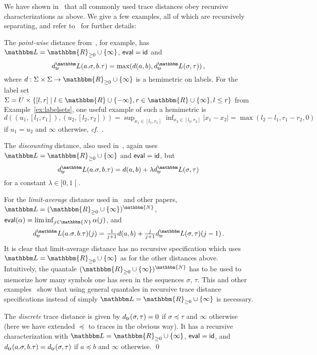\documentclass[twocolumn]{svjour3-dummy}
\newcommand*\labpre{\preccurlyeq}
\newcommand*\cf{\textit{cf.}\xspace}
\newcommand*\Real{\mathbbm{R}}
\newcommand*\LL{\mathbbm L}
\newcommand*\Realnn{\Real_{ \ge 0}}
\newcommand*\eval{\textup{\textsf{eval}}}
\newcommand*\td{d_\textup{\textsf{tr}}} \newcommand*\tdl{\td^\LL}
\newcommand*\id{\textup{\textsf{id}}}
\newcommand*\Nat{\mathbbm{N}}
\begin{document}
\begin{example}
  \label{ex:distances}
  We have shown in~\cite{DBLP:conf/fsttcs/FahrenbergLT11, DBLP:conf/csr/BauerFLT12,
    DBLP:conf/aplas/FahrenbergL13, DBLP:journals/tcs/FahrenbergL14,
    DBLP:journals/acta/FahrenbergL14} that all commonly used trace
  distances obey recursive characterizations as above.  We give a few
  examples, all of which are recursively separating, and refer
  to~\cite{DBLP:journals/tcs/FahrenbergL14,
    DBLP:journals/acta/FahrenbergL14} for further details:

  The \emph{point-wise} distance
  from~\cite{DBLP:journals/tcs/AlfaroFHMS05}, for example, has $\LL=
  \Realnn\cup\{ \infty\}$, $\eval= \id$ and
  \begin{equation*}
    \tdl( a. \sigma,
    b. \tau)= \max( d( a, b), \tdl( \sigma, \tau))\,,
  \end{equation*}
  where $d: \Sigma\times \Sigma\to \Realnn\cup\{ \infty\}$ is a
  hemimetric on labels.  For the label set $\Sigma= U\times\{[ l, r]\mid
  l\in \Real\cup\{ -\infty\}, r\in \Real\cup\{ \infty\}, l\le r\}$ from
  Example~\ref{ex:labelsets}, one useful example of such a hemimetric is
  $d(( u_1,[ l_1, r_1]),( u_2,[ l_2, r_2]))= \sup_{ x_1\in[ l_1, r_1]}
  \inf_{ x_2\in[ l_2, r_2]}| x_1- x_2|= \max( l_2- l_1, r_1- r_2, 0)$ if
  $u_1= u_2$ and $\infty$ otherwise,
  \cf~\cite{DBLP:journals/fmsd/BauerFJLLT13}.

  The \emph{discounting} distance, also used
  in~\cite{DBLP:journals/tcs/AlfaroFHMS05}, again uses $\LL=
  \Realnn\cup\{ \infty\}$ and $\eval= \id$, but
  \begin{equation*}
    \tdl( a. \sigma,
    b. \tau)= d( a, b)+ \lambda \tdl( \sigma, \tau)
  \end{equation*}
  for a constant $\lambda\in[ 0, 1\mathclose[$.

  For the \emph{limit-average} distance used
  in~\cite{DBLP:journals/tcs/CernyHR12} and other papers, $\LL=(
  \Realnn\cup\{ \infty\})^\Nat$, $\eval( \alpha)= \liminf_{ j\in \Nat}
  \alpha( j)$, and
  \begin{equation*}
    \tdl( a. \sigma, b. \tau)( j)= \tfrac 1{ j+ 1}d( a,
    b)+ \tfrac j{ j+ 1} \tdl( \sigma, \tau)( j- 1)\,.
  \end{equation*}
  It is clear that limit-average distance has no recursive
  specification which uses $\LL= \Realnn\cup\{ \infty\}$ as for the
  other distances above.  Intuitively, the quantale $( \Realnn\cup\{
  \infty\})^\Nat$ has to be used to memorize how many symbols one has
  seen in the sequences $\sigma$, $\tau$.  This and other
  examples~\cite{DBLP:journals/tcs/FahrenbergL14,
    DBLP:journals/acta/FahrenbergL14} show that using general
  quantales in recursive trace distance specifications instead of
  simply $\LL= \Realnn\cup\{ \infty\}$ is necessary.

  The \emph{discrete} trace distance is given by $\td( \sigma, \tau)= 0$
  if $\sigma\labpre \tau$ and $\infty$ otherwise (here we have extended
  $\labpre$ to traces in the obvious way).  It has a recursive
  characterization with $\LL= \Realnn\cup\{ \infty\}$, $\eval= \id$, and
  $\td( a. \sigma, b. \tau)= \td( \sigma, \tau)$ if $a\labpre b$ and
  $\infty$ otherwise. \qed
\end{example}
\end{document}
